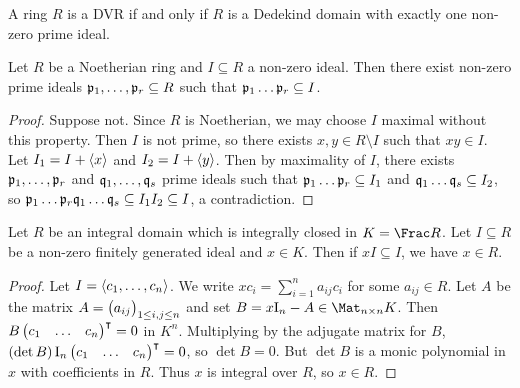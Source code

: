 \begin{theorem}
\label{thm:10.7}
A ring $ R $ is a DVR if and only if $ R $ is a Dedekind domain with exactly one non-zero prime ideal.
\end{theorem}

\begin{lemma}
\label{lem:10.8}
Let $ R $ be a Noetherian ring and $ I \subseteq R $ a non-zero ideal. Then there exist non-zero prime ideals $ \mathfrak{p}_1, \dots, \mathfrak{p}_r \subseteq R $ such that $ \mathfrak{p}_1 \dots \mathfrak{p}_r \subseteq I $.
\end{lemma}

\begin{proof}
Suppose not. Since $ R $ is Noetherian, we may choose $ I $ maximal without this property. Then $ I $ is not prime, so there exists $ x, y \in R \setminus I $ such that $ xy \in I $. Let $ I_1 = I + \left\langle x \right\rangle $ and $ I_2 = I + \left\langle y \right\rangle $. Then by maximality of $ I $, there exists $ \mathfrak{p}_1, \dots, \mathfrak{p}_r $ and $ \mathfrak{q}_1, \dots, \mathfrak{q}_s $ prime ideals such that $ \mathfrak{p}_1 \dots \mathfrak{p}_r \subseteq I_1 $ and $ \mathfrak{q}_1 \dots \mathfrak{q}_s \subseteq I_2 $, so $ \mathfrak{p}_1 \dots \mathfrak{p}_r\mathfrak{q}_1 \dots \mathfrak{q}_s \subseteq I_1I_2 \subseteq I $, a contradiction.
\end{proof}

\begin{lemma}
\label{lem:10.9}
Let $ R $ be an integral domain which is integrally closed in $ K = \Frac R $. Let $ I \subseteq R $ be a non-zero finitely generated ideal and $ x \in K $. Then if $ xI \subseteq I $, we have $ x \in R $.
\end{lemma}

\begin{proof}
Let $ I = \left\langle c_1, \dots, c_n \right\rangle $. We write $ xc_i = \sum_{i = 1}^n a_{ij}c_i $ for some $ a_{ij} \in R $. Let $ A $ be the matrix $ A = \br{a_{ij}}_{1 \le i, j \le n} $ and set $ B = x\I_n - A \in \Mat_{n \times n} K $. Then $ B\onebythree{c_1}{\dots}{c_n}^\intercal = 0 $ in $ K^n $. Multiplying by the adjugate matrix for $ B $, $ \br{\det B}\I_n\onebythree{c_1}{\dots}{c_n}^\intercal = 0 $, so $ \det B = 0 $. But $ \det B $ is a monic polynomial in $ x $ with coefficients in $ R $. Thus $ x $ is integral over $ R $, so $ x \in R $.
\end{proof}

